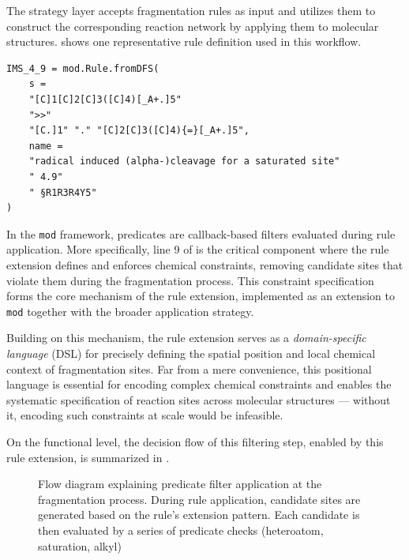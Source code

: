 The strategy layer accepts fragmentation rules as input and utilizes them to construct the corresponding reaction network by applying them to molecular structures.
 shows one representative rule definition used in this workflow.


\begin{listing}[ht]
    \centering
    \begin{verbatim}
IMS_4_9 = mod.Rule.fromDFS(
    s =
    "[C]1[C]2[C]3([C]4)[_A+.]5"
    ">>"
    "[C.]1" "." "[C]2[C]3([C]4){=}[_A+.]5",
    name =
    "radical induced (alpha-)cleavage for a saturated site"
    " 4.9"
    " §R1R3R4Y5"
)
    \end{verbatim}
    \caption{Sample Fragmentation Rule \cite[p.~59]{McLafferty1993}}
    \label{lst:sampelRule}
\end{listing}

In the \texttt{mod} framework, predicates are callback-based filters evaluated during rule application.
More specifically, line 9 of  is the critical component where the rule extension defines and enforces chemical constraints, removing candidate sites that violate them during the fragmentation process.
This constraint specification forms the core mechanism of the rule extension, implemented as an extension to \texttt{mod} together with the broader application strategy.

Building on this mechanism, the rule extension serves as a \emph{domain-specific language} (DSL) for precisely defining the spatial position and local chemical context of fragmentation sites.
Far from a mere convenience, this positional language is essential for encoding complex chemical constraints and enables the systematic specification of reaction sites across molecular structures --- without it, encoding such constraints at scale would be infeasible.

On the functional level, the decision flow of this filtering step, enabled by this rule extension, is summarized in .

\begin{figure}
    \centering
    
    \caption[Flow diagram of predicate filter application]{
        Flow diagram explaining predicate filter application at the fragmentation process.
        During rule application, candidate sites are generated based on the rule's extension pattern.
        Each candidate is then evaluated by a series of predicate checks (heteroatom, saturation, alkyl)
    }
    \label{fig:predicate-filter}
\end{figure}

